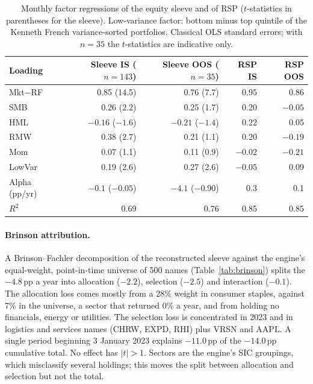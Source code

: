 \documentclass[11pt]{article}
\begin{document}
\begin{table}[t]
\centering
\caption{Monthly factor regressions of the equity sleeve and of RSP ($t$-statistics in parentheses for the sleeve). Low-variance factor: bottom minus top quintile of the Kenneth French variance-sorted portfolios. Classical OLS standard errors; with $n=35$ the $t$-statistics are indicative only.}
\label{tab:factors}
\small
\begin{tabular}{lrrrr}
\toprule
Loading & Sleeve IS ($n=143$) & Sleeve OOS ($n=35$) & RSP IS & RSP OOS \\
\midrule
Mkt$-$RF & 0.85 (14.5) & 0.76 (7.7) & 0.95 & 0.86 \\
SMB & 0.26 (2.2) & 0.25 (1.7) & 0.20 & $-0.05$ \\
HML & $-0.16$ ($-1.6$) & $-0.21$ ($-1.4$) & 0.22 & 0.05 \\
RMW & 0.38 (2.7) & 0.21 (1.1) & 0.20 & $-0.19$ \\
Mom & 0.07 (1.1) & 0.11 (0.9) & $-0.02$ & $-0.21$ \\
LowVar & 0.19 (2.6) & 0.27 (2.6) & $-0.05$ & 0.09 \\
Alpha (pp/yr) & $-0.1$ ($-0.05$) & $-4.1$ ($-0.90$) & 0.3 & 0.1 \\
$R^2$ & 0.69 & 0.76 & 0.85 & 0.85 \\
\bottomrule
\end{tabular}
\end{table}

\paragraph{Brinson attribution.} A Brinson--Fachler decomposition \citep{BrinsonFachler1985,BrinsonHoodBeebower1986} of the reconstructed sleeve against the engine's equal-weight, point-in-time universe of 500 names (Table~\ref{tab:brinson}) splits the $-4.8$\,pp a year into allocation ($-2.2$), selection ($-2.5$) and interaction ($-0.1$). The allocation loss comes mostly from a 28\% weight in consumer staples, against 7\% in the universe, a sector that returned 0\% a year, and from holding no financials, energy or utilities. The selection loss is concentrated in 2023 and in logistics and services names (CHRW, EXPD, RHI) plus VRSN and AAPL. A single period beginning 3 January 2023 explains $-11.0$\,pp of the $-14.0$\,pp cumulative total. No effect has $|t|>1$. Sectors are the engine's SIC groupings, which misclassify several holdings; this moves the split between allocation and selection but not the total.
\end{document}
